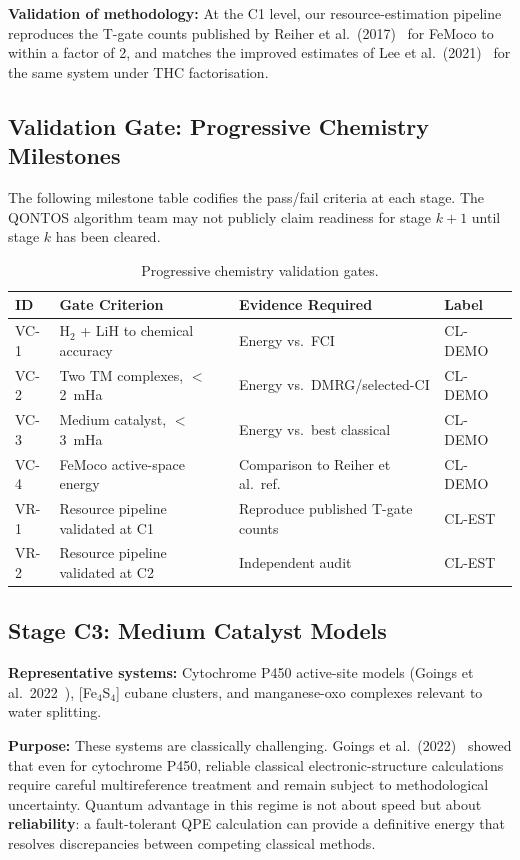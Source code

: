 \documentclass[conference]{IEEEtran}
\begin{document}
\textbf{Validation of methodology:} At the C1 level, our resource-estimation pipeline
reproduces the T-gate counts published by Reiher et al.\ (2017)~\cite{reiher2017} for FeMoco to within a
factor of 2, and matches the improved estimates of Lee et al.\ (2021)~\cite{lee2021} for the same
system under THC factorisation.

\subsection{Validation Gate: Progressive Chemistry Milestones}

The following milestone table codifies the pass/fail criteria at each stage. The
QONTOS algorithm team may not publicly claim readiness for stage $k{+}1$ until stage $k$
has been cleared.

\begin{table}[H]
\centering
\caption{Progressive chemistry validation gates.}
\label{tab:validation_gates}
\begin{tabular}{@{}l L{2.5cm} L{2.5cm} l@{}}
\toprule
\textbf{ID} & \textbf{Gate Criterion} & \textbf{Evidence Required} & \textbf{Label} \\
\midrule
VC-1 & H$_2$ + LiH to chemical accuracy & Energy vs.\ FCI & CL-DEMO \\
VC-2 & Two TM complexes, $<$2~mHa & Energy vs.\ DMRG/selected-CI & CL-DEMO \\
VC-3 & Medium catalyst, $<$3~mHa & Energy vs.\ best classical & CL-DEMO \\
VC-4 & FeMoco active-space energy & Comparison to Reiher et al.\ ref. & CL-DEMO \\
VR-1 & Resource pipeline validated at C1 & Reproduce published T-gate counts & CL-EST \\
VR-2 & Resource pipeline validated at C2 & Independent audit & CL-EST \\
\bottomrule
\end{tabular}
\end{table}

\subsection{Stage C3: Medium Catalyst Models}

\textbf{Representative systems:} Cytochrome P450 active-site models (Goings et al.\ 2022~\cite{goings2022}),
[Fe$_4$S$_4$] cubane clusters, and manganese-oxo complexes relevant to water splitting.

\textbf{Purpose:} These systems are classically challenging. Goings et al.\ (2022)~\cite{goings2022} showed that
even for cytochrome P450, reliable classical electronic-structure calculations require
careful multireference treatment and remain subject to methodological uncertainty.
Quantum advantage in this regime is not about speed but about \textbf{reliability}: a
fault-tolerant QPE calculation can provide a definitive energy that resolves
discrepancies between competing classical methods.
\end{document}
